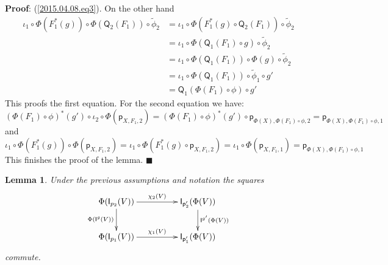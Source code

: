 \documentclass[12pt]{article}
\numberwithin{equation}{section}
\newenvironment{myproof}{{\bf Proof}:}{$\blacksquare$ \vskip 5mm }
\newtheorem{lemma}[proposition]{Lemma}
\newcommand{\llabel}[1]{\label{#1}}
\newcommand{\wt}{\widetilde}
\newcommand{\p}{\mathsf{p}}
\newcommand{\I}{\mathsf{I}}
\newcommand{\Q}{\mathsf{Q}}
\begin{document}
\begin{myproof}
(\ref{2015.04.08.eq3}). On the other hand
%
\begin{align*}
  \iota_1\circ \Phi(F_1^*(g))\circ \Phi(\Q_2(F_1))\circ\wt{\phi}_2
    & = \iota_1\circ \Phi(F_1^*(g)\circ \Q_2(F_1))\circ \wt{\phi}_2 \\
    & = \iota_1\circ \Phi(\Q_1(F_1)\circ g)\circ \wt{\phi}_2 \\
    & = \iota_1\circ \Phi(\Q_1(F_1))\circ \Phi(g)\circ \wt{\phi}_2 \\
    & = \iota_1\circ \Phi(\Q_1(F_1))\circ \wt{\phi}_1\circ g' \\
    & = \Q_1(\Phi(F_1)\circ \phi)\circ g'
\end{align*}
%
This proofs the first equation. For the second equation we have:
%
$$(\Phi(F_1)\circ \phi)^*(g')\circ \iota_2\circ
\Phi(\p_{X,F_1,2})=(\Phi(F_1)\circ \phi)^*(g')\circ
\p_{\Phi(X),\Phi(F_1)\circ\phi,2}=\p_{\Phi(X),\Phi(F_1)\circ\phi,1}$$
%
and
%
$$\iota_1\circ \Phi(F_1^*(g))\circ \Phi(\p_{X,F_1,2})=\iota_1\circ
\Phi(F_1^*(g)\circ \p_{X,F_1,2})=\iota_1\circ
\Phi(\p_{X,F_1,1})=\p_{\Phi(X),\Phi(F_1)\circ \phi,1}$$
%
This finishes the proof of the lemma.
\end{myproof}
%
\begin{lemma}
\llabel{2015.04.06.l7} Under the previous assumptions and notation the squares
%
$$
\begin{xy}
          \xymatrix@C=4pc{ \Phi(\I_{p_2}(V)) \ar[r]^-{\chi_2(V)}
            \ar[d]_{\Phi(\I^g(V))} & \I_{\p_2'}(\Phi(V))
            \ar[d]^{\I^{g'}(\Phi(V))}\\ \Phi(\I_{p_1}(V)) \ar[r]^{\chi_1(V)} &
            \I_{\p_1'}(\Phi(V)) }
\end{xy}
$$
%
commute.
\end{lemma}
%
\end{document}
